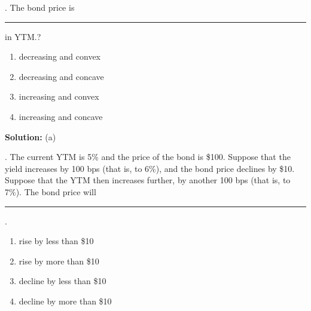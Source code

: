 \documentclass[11.5pt]{article}
\begin{document}
\newcommand*\ruleline[1]{\par\noindent\raisebox{.8ex}{\makebox[\linewidth]{\hrulefill\hspace{1ex}\raisebox{-.8ex}{#1}\hspace{1ex}\hrulefill}}}

\renewcommand{\headheight}{0.7in}
\setlength{\headwidth}{\textwidth}
\renewcommand{\footrulewidth}{0.4pt}
\fancyfoot[L]{\sc{}}
\pagestyle{fancy}
\vspace{1.5cm}
\onehalfspacing

\begin{center}
\large{\textbf{}}
\vspace{1.0cm}
\end{center}



\vspace{20pt}


. The bond price is \rule{1cm}{0.15mm} in YTM.?

\begin{enumerate}[a]

\item decreasing and convex

\item decreasing and concave

\item increasing and convex

\item increasing and concave
\end{enumerate}

\textbf{Solution:}  (a)


\vspace{30pt}


. The current YTM is 5\% and the price of the bond is \$100. Suppose that the yield increases by 100 bps (that is, to 6\%), and the bond price declines by \$10. Suppose that the YTM then increases further, by another 100 bps (that is, to 7\%). The bond price will \rule{1cm}{0.15mm}.


\begin{enumerate}[a]
	
	\item rise by less than \$10
	
	\item rise by more than \$10
	
	\item decline by less than \$10
	
	\item decline by more than \$10
\end{enumerate}
\end{document}
